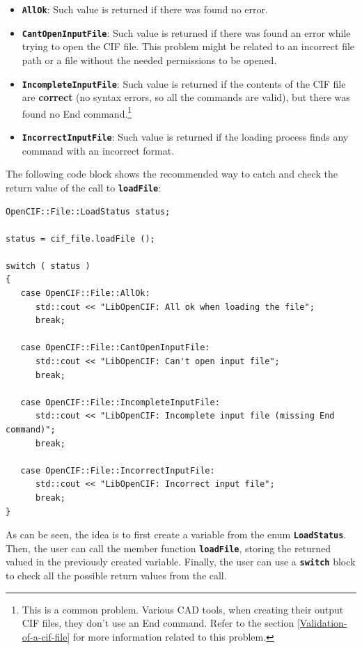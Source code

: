 \documentclass[11pt,twoside,openany,x11names,svgnames]{memoir}
\begin{document}
\begin{itemize}
	\item \textbf{\texttt{AllOk}}: Such value is returned if there was found no error.
	
	\item \textbf{\texttt{CantOpenInputFile}}: Such value is returned if there was found an error while trying to open the CIF file. This problem might be related to an incorrect file path or a file without the needed permissions to be opened.
	
	\item \textbf{\texttt{IncompleteInputFile}}: Such value is returned if the contents of the CIF file are \textbf{correct} (no syntax errors, so all the commands are valid), but there was found no End command.\footnote{This is a common problem. Various CAD tools, when creating their output CIF files, they don't use an End command. Refer to the section \ref{Validation-of-a-cif-file} for more information related to this problem.}
	
	\item \textbf{\texttt{IncorrectInputFile}}: Such value is returned if the loading process finds any command with an incorrect format.
\end{itemize}

The following code block shows the recommended way to catch and check the return value of the call to \textbf{\texttt{loadFile}}:

\begin{lstlisting}[frame=single,style=CPPStyle]
OpenCIF::File::LoadStatus status;
   
status = cif_file.loadFile ();
   
switch ( status )
{
   case OpenCIF::File::AllOk:
      std::cout << "LibOpenCIF: All ok when loading the file";
      break;
         
   case OpenCIF::File::CantOpenInputFile:
      std::cout << "LibOpenCIF: Can't open input file";
      break;
         
   case OpenCIF::File::IncompleteInputFile:
      std::cout << "LibOpenCIF: Incomplete input file (missing End command)";
      break;
         
   case OpenCIF::File::IncorrectInputFile:
      std::cout << "LibOpenCIF: Incorrect input file";
      break;
}
\end{lstlisting}

As can be seen, the idea is to first create a variable from the enum \textbf{\texttt{LoadStatus}}. Then, the user can call the member function \textbf{\texttt{loadFile}}, storing the returned valued in the previously created variable. Finally, the user can use a \textbf{\texttt{switch}} block to check all the possible return values from the call.
\end{document}
